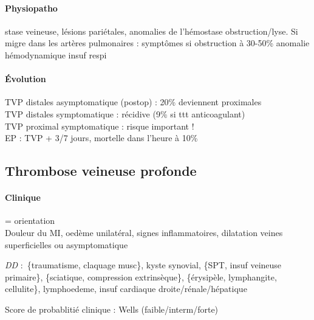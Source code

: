 \paragraph{Physiopatho} stase veineuse, lésions pariétales, anomalies de l'hémostase \thus
obstruction/lyse. Si migre dans les artères pulmonaires : symptômes si
obstruction à 30-50\% \thus anomalie hémodynamique \thus insuf respi

\paragraph{Évolution}
TVP distales asymptomatique (postop) : 20\% deviennent proximales\\
TVP distales symptomatique : récidive (9\% si ttt anticoagulant)\\
TVP proximal symptomatique : risque important !\\
EP : TVP + 3/7 jours, mortelle dans l'heure à 10\%

\subsection{Thrombose veineuse profonde}

\paragraph{Clinique} = orientation\\
Douleur du MI, oedème unilatéral, signes inflammatoires, dilatation veines
superficielles ou asymptomatique

\textit{DD}  : \{traumatisme, claquage musc\}, kyste synovial, \{SPT, insuf veineuse
primaire\}, \{sciatique, compression extrinsèque\}, \{érysipèle, lymphangite,
cellulite\}, lymphoedeme, insuf cardiaque droite/rénale/hépatique

Score de probablitié clinique : Wells (faible/interm/forte)

